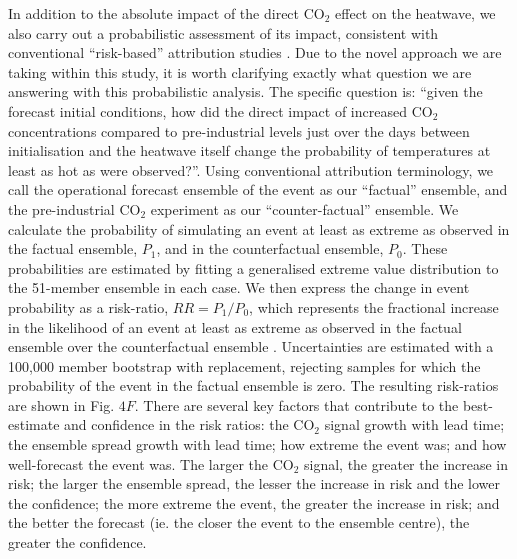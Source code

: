   In addition to the absolute impact of the direct CO$_2$ effect on the heatwave, we also carry out a probabilistic assessment of its impact, consistent with conventional ``risk-based'' attribution studies \citep{shepherd_common_2016,winsberg_severe_2020}. Due to the novel approach we are taking within this study, it is worth clarifying exactly what question we are answering with this probabilistic analysis. The specific question is: ``given the forecast initial conditions, how did the direct impact of increased CO$_2$ concentrations compared to pre-industrial levels just over the days between initialisation and the heatwave itself change the probability of temperatures at least as hot as were observed?''. Using conventional attribution terminology, we call the operational forecast ensemble of the event as our ``factual'' ensemble, and the pre-industrial CO$_2$ experiment as our ``counter-factual'' ensemble. We calculate the probability of simulating an event at least as extreme as observed in the factual ensemble, $P_1$, and in the counterfactual ensemble, $P_0$. These probabilities are estimated by fitting a generalised extreme value distribution to the 51-member ensemble in each case. We then express the change in event probability as a risk-ratio, $RR=P_1/P_0$, which represents the fractional increase in the likelihood of an event at least as extreme as observed in the factual ensemble over the counterfactual ensemble \citep{stott_human_2004,stone_end--end_2005}. Uncertainties are estimated with a 100,000 member bootstrap with replacement, rejecting samples for which the probability of the event in the factual ensemble is zero. The resulting risk-ratios are shown in Fig. $4F$. There are several key factors that contribute to the best-estimate and confidence in the risk ratios: the CO$_2$ signal growth with lead time; the ensemble spread growth with lead time; how extreme the event was; and how well-forecast the event was. The larger the CO$_2$ signal, the greater the increase in risk; the larger the ensemble spread, the lesser the increase in risk and the lower the confidence; the more extreme the event, the greater the increase in risk; and the better the forecast (ie. the closer the event to the ensemble centre), the greater the confidence. 
  
